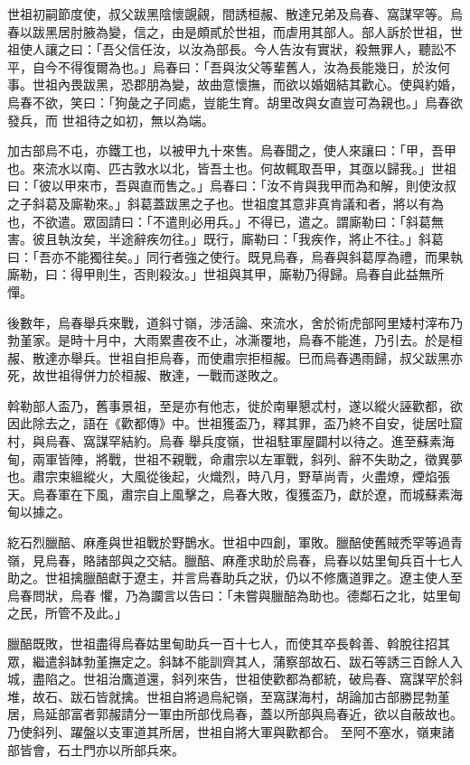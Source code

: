 \begin{pinyinscope}
 世祖初嗣節度使，叔父跋黑陰懷覬覦，間誘桓赧、散達兄弟及烏春、窩謀罕等。烏春以跋黑居肘腋為變，信之，由是頗貳於世祖，而虐用其部人。部人訴於世祖，世祖使人讓之曰：「吾父信任汝，以汝為部長。今人告汝有實狀，殺無罪人，聽訟不平，自今不得復爾為也。」烏春曰：「吾與汝父等輩舊人，汝為長能幾日，於汝何事。世祖內畏跋黑，恐郡朋為變，故曲意懷撫，而欲以婚姻結其歡心。使與約婚，烏春不欲，笑曰：「狗彘之子同處，豈能生育。胡里改與女直豈可為親也。」烏春欲發兵，而
 世祖待之如初，無以為端。



 加古部烏不屯，亦鐵工也，以被甲九十來售。烏春聞之，使人來讓曰：「甲，吾甲也。來流水以南、匹古敦水以北，皆吾土也。何故輒取吾甲，其亟以歸我。」世祖曰：「彼以甲來市，吾與直而售之。」烏春曰：「汝不肯與我甲而為和解，則使汝叔之子斜葛及廝勒來。」斜葛蓋跋黑之子也。世祖度其意非真肯議和者，將以有為也，不欲遣。眾固請曰：「不遣則必用兵。」不得已，遣之。謂廝勒曰：「斜葛無害。彼且執汝矣，半途辭疾勿往。」既行，廝勒曰：「我疾作，將止不往。」斜葛曰：「吾亦不能獨往矣。」同行者強之使行。既見烏春，烏春與斜葛厚為禮，而果執
 廝勒，曰：得甲則生，否則殺汝。」世祖與其甲，廝勒乃得歸。烏春自此益無所憚。



 後數年，烏春舉兵來戰，道斜寸嶺，涉活論、來流水，舍於術虎部阿里矮村滓布乃勃堇家。是時十月中，大雨累晝夜不止，冰澌覆地，烏春不能進，乃引去。於是桓赧、散達亦舉兵。世祖自拒烏春，而使肅宗拒桓赧。巳而烏春遇雨歸，叔父跋黑亦死，故世祖得併力於桓赧、散達，一戰而遂敗之。



 斡勒部人盃乃，舊事景祖，至是亦有他志，徙於南畢懇忒村，遂以縱火誣歡都，欲因此除去之，語在《歡都傳》中。世祖獲盃乃，釋其罪，盃乃終不自安，徙居吐窟村，與烏春、窩謀罕結約。烏春
 舉兵度嶺，世祖駐軍屋闢村以待之。進至蘇素海甸，兩軍皆陣，將戰，世祖不親戰，命肅宗以左軍戰，斜列、辭不失助之，徵異夢也。肅宗束縕縱火，大風從後起，火熾烈，時八月，野草尚青，火盡燎，煙焰張天。烏春軍在下風，肅宗自上風擊之，烏春大敗，復獲盃乃，獻於遼，而城蘇素海甸以據之。



 紇石烈臘醅、麻產與世祖戰於野鵲水。世祖中四創，軍敗。臘醅使舊賊禿罕等過青嶺，見烏春，賂諸部與之交結。臘醅、麻產求助於烏春，烏春以姑里甸兵百十七人助之。世祖擒臘醅獻于遼主，并言烏春助兵之狀，仍以不修鷹道罪之。遼主使人至烏春問狀，烏春
 懼，乃為讕言以告曰：「未嘗與臘醅為助也。德鄰石之北，姑里甸之民，所管不及此。」



 臘醅既敗，世祖盡得烏春姑里甸助兵一百十七人，而使其卒長斡善、斡脫往招其眾，繼遣斜缽勃堇撫定之。斜缽不能訓齊其人，蒲察部故石、跋石等誘三百餘人入城，盡陷之。世祖治鷹道還，斜列來告，世祖使歡都為都統，破烏春、窩謀罕於斜堆，故石、跋石皆就擒。世祖自將過烏紀嶺，至窩謀海村，胡論加古部勝昆勃堇居，烏延部富者郭赧請分一軍由所部伐烏春，蓋以所部與烏春近，欲以自蔽故也。乃使斜列、躍盤以支軍道其所居，世祖自將大軍與歡都合。
 至阿不塞水，嶺東諸部皆會，石土門亦以所部兵來。




\end{pinyinscope}
